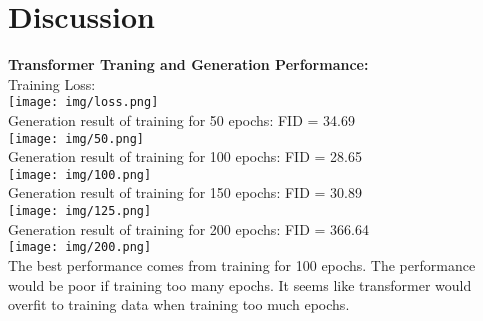 \documentclass{article} %
\begin{document}
    \section{Discussion}
    \textbf{Transformer Traning and Generation Performance:}\\
    Training Loss:\\
    \texttt{[image: img/loss.png]}\\
    Generation result of training for 50 epochs: FID = 34.69\\
    \texttt{[image: img/50.png]}\\
    Generation result of training for 100 epochs: FID = 28.65\\
    \texttt{[image: img/100.png]}\\
    Generation result of training for 150 epochs: FID = 30.89\\
    \texttt{[image: img/125.png]}\\
    Generation result of training for 200 epochs: FID = 366.64\\
    \texttt{[image: img/200.png]}\\
    The best performance comes from training for 100 epochs. The performance would be poor if training too many epochs. It seems like transformer would overfit to training data when training too much epochs.\\
\end{document}
